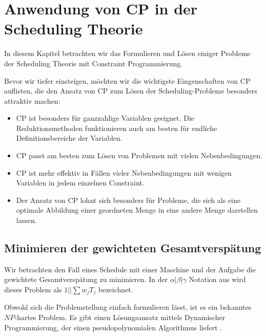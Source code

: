 \chapter{ Anwendung von CP in der Scheduling Theorie}

In diesem Kapitel betrachten wir das Formulieren und Lösen einiger Probleme der Scheduling Theorie mit Constraint Programmierung.

Bevor wir tiefer einsteigen, möchten wir die wichtigste Eingenschaften von CP auflisten, die den Ansatz von CP zum Lösen der Scheduling-Probleme besonders attraktiv machen:
\begin{itemize} \itemsep0pt
	\item CP ist besonders für ganzzahlige Variablen geeignet. Die Reduktionsmethoden funktionieren auch am besten für endliche Definitionsbereiche der Variablen.
	\item CP passt am besten zum Lösen von Problemen mit vielen Nebenbedingungen.
	\item CP ist mehr effektiv in Fällen vieler Nebenbedingungen mit wenigen Variablen in jedem einzelnen Constraint.
	\item Der Ansatz von CP lohnt sich besonders für Probleme, die sich als eine optimale Abbildung einer geordneten Menge in eine andere Menge darstellen lassen.
\end{itemize}


\section{Minimieren der gewichteten Gesamtverspätung}
Wir betrachten den Fall eines Schedule mit einer Maschine und der Aufgabe die gewichtete Gesamtverspätung zu minimieren. In der $\alpha|\beta|\gamma$ Notation aus \cite{Pinedo} wird dieses Problem als $1||\sum{w_jT_j}$ bezeichnet.

Obwohl sich die Problemstellung einfach formulieren lässt, ist es ein bekanntes $NP$-hartes Problem. Es gibt einen Lösungsansatz mittels Dynamischer Programmierung, der einen pseudopolynomialen Algorithmus liefert \citep[vgl.][]{Pinedo}.

%
%


